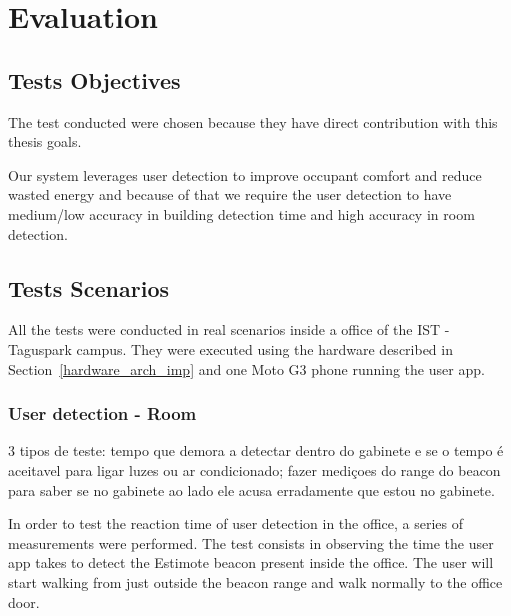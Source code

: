 \chapter{Evaluation}
\label{chapter:evaluation}

\section{Tests Objectives}

The test conducted were chosen because they have direct contribution with this thesis goals.

Our system leverages user detection to improve occupant comfort and reduce wasted energy and because of that we require the user detection to have medium/low accuracy in building detection time and high accuracy in room detection.




\section{Tests Scenarios}



All the tests were conducted in real scenarios inside a office of the IST - Taguspark campus. They
were executed using the hardware described in Section~\ref{hardware_arch_imp} and one Moto G3 phone running the user app.


\subsection{User detection - Room}

3 tipos de teste:
tempo que demora a detectar dentro do gabinete e se o tempo é aceitavel para ligar luzes ou ar condicionado;
fazer mediçoes do range do beacon para saber se no gabinete ao lado ele acusa erradamente que estou no gabinete.




In order to test the reaction time of user detection in the office, a series of measurements were performed. The test consists in observing the time the user app takes to detect the Estimote beacon present inside the office. The user will start walking from just outside the beacon range and walk normally to the office door.

